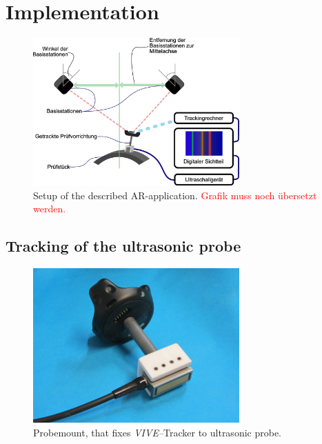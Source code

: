 \documentclass{VRARWorkshop}
\begin{document}
\section{Implementation}
\cite{dorner_virtual_2013}

\begin{figure}[h!]
    \begin{center}
        \includegraphics[width=79mm]{images/Setup.eps}
        \caption{\label{fig:Setup} Setup of the described AR-application. \textcolor{red}{Grafik muss noch übersetzt werden.}}
    \end{center}
\end{figure}

\subsection{Tracking of the ultrasonic probe}

\begin{figure}[h!]
    \begin{center}
        \includegraphics[width=79mm]{images/probemount.jpg}
        \caption{\label{fig:probemount} Probemount, that fixes \textit{VIVE--}Tracker to ultrasonic probe.}
    \end{center}
\end{figure}
\end{document}
